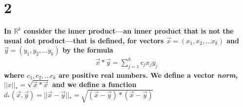 \documentclass{article}
\begin{document}
\section*{2}
\noindent \textbf{In $\mathbb{R}^k$ consider the inner product---an inner product that is not the usual dot product---that is defined, for vectors $\vec{x} = (x_1,x_2,...x_k)$ and $\vec{y} = (y_1,y_2,...y_k)$ by the formula}\begin{align*}
    \vec{x} * \vec{y} = \sum^k_{j=1}c_jx_jy_j
\end{align*}
\textbf{where $c_1,c_2,...c_k$ are positive real numbers. We define a vector \emph{norm}, $||x||_* = \sqrt{\vec{x} * \vec{x}}$ and we define a function $d_*(\vec{x}, \vec{y}) = ||\vec{x} - \vec{y}||_* = \sqrt{(\vec{x} - \vec{y})*(\vec{x} - \vec{y})}$}\\\vspace{10pt}
\end{document}
